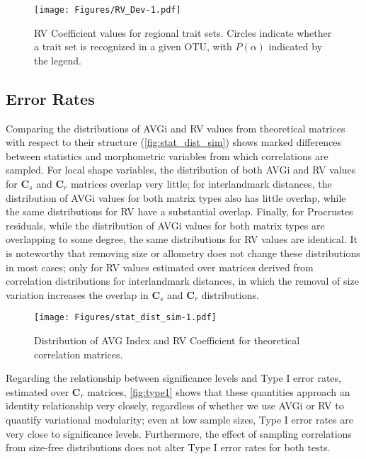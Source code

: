 \documentclass[11pt,twoside]{report}
\begin{document}
\begin{figure}[htbp]
\centering
\texttt{[image: Figures/RV\_Dev-1.pdf]}
\caption{RV Coefficient values for regional trait sets. Circles indicate
whether a trait set is recognized in a given OTU, with $P(\alpha)$
indicated by the legend. \label{fig:RV_Dev}}
\end{figure}

\subsection{Error Rates}\label{error-rates}

Comparing the distributions of AVGi and RV values from theoretical
matrices with respect to their structure (\autoref{fig:stat_dist_sim})
shows marked differences between statistics and morphometric variables
from which correlations are sampled. For local shape variables, the
distribution of both AVGi and RV values for $\mathbf{C}_s$ and
$\mathbf{C}_r$ matrices overlap very little; for interlandmark
distances, the distribution of AVGi values for both matrix types also
has little overlap, while the same distributions for RV have a
substantial overlap. Finally, for Procrustes residuals, while the
distribution of AVGi values for both matrix types are overlapping to
some degree, the same distributions for RV values are identical. It is
noteworthy that removing size or allometry does not change these
distributions in most cases; only for RV values estimated over matrices
derived from correlation distributions for interlandmark distances, in
which the removal of size variation increases the overlap in
$\mathbf{C}_s$ and $\mathbf{C}_r$ distributions.

\begin{figure}[htbp]
\centering
\texttt{[image: Figures/stat\_dist\_sim-1.pdf]}
\caption{Distribution of AVG Index and RV Coefficient for theoretical
correlation matrices. \label{fig:stat_dist_sim}}
\end{figure}

Regarding the relationship between significance levels and Type I error
rates, estimated over $\mathbf{C}_r$ matrices, \autoref{fig:type1} shows
that these quantities approach an identity relationship very closely,
regardless of whether we use AVGi or RV to quantify variational
modularity; even at low sample sizes, Type I error rates are very close
to significance levels. Furthermore, the effect of sampling correlations
from size-free distributions does not alter Type I error rates for both
tests.
\end{document}
